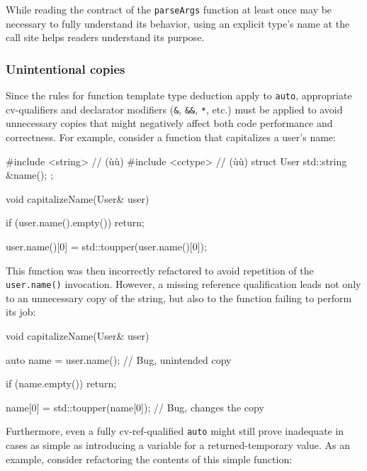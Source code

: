 \noindent While reading the contract of the \lstinline!parseArgs!
function at least once may be necessary to fully understand its behavior, using an
explicit type's name at the call site helps readers understand its
purpose.

\subsubsection[Unintentional copies]{Unintentional copies}\label{unintentional-copies}

Since the rules for function template type deduction apply to
\lstinline!auto!, appropriate cv-qualifiers and declarator modifiers
(\lstinline!&!, \lstinline!&&!, \lstinline!*!, etc.) must be applied to avoid
unnecessary copies that might negatively affect both code performance
and correctness. For example, consider a function that capitalizes a
user's name:

\begin{emcppshiddenlisting}[emcppsbatch={e13,e14}]
#include <string>  // (ù{}ù)
#include <cctype>  // (ù{}ù)
struct User {
   std::string &name();
};
\end{emcppshiddenlisting}
\begin{emcppslisting}[emcppsbatch=e13]
void capitalizeName(User& user)
{
    if (user.name().empty())
    {
        return;
    }

    user.name()[0] = std::toupper(user.name()[0]);
}
\end{emcppslisting}
    
\noindent This function was then incorrectly refactored to avoid repetition of
the \lstinline!user.name()! invocation. However, a missing reference
qualification leads not only to an unnecessary copy of the string, but
also to the function failing to perform its job:

\begin{emcppslisting}[emcppsbatch=e14]
void capitalizeName(User& user)
{
    auto name = user.name();  // Bug, unintended copy

    if (name.empty())
    {
         return;
    }

    name[0] = std::toupper(name[0]);  // Bug, changes the copy
}
\end{emcppslisting}
    
\noindent Furthermore, even a fully cv-ref-qualified \lstinline!auto! might still
prove inadequate in cases as simple as introducing a variable for a
returned-temporary value. As an example, consider refactoring the
contents of this simple function:


